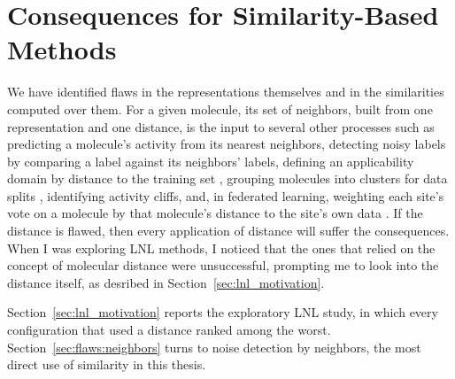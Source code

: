 \section{Consequences for Similarity-Based Methods}\label{sec:flaws:consequences}


We have identified flaws in the representations themselves and in the similarities computed over them. For a given molecule, its set of neighbors, built from one representation and one distance, is the input to several other processes such as predicting a molecule's activity from its nearest neighbors, detecting noisy labels by comparing a label against its neighbors' labels, defining an applicability domain by distance to the training set \citep{Tropsha2010}, grouping molecules into clusters for data splits \citep{Butina1999}, identifying activity cliffs, and, in federated learning, weighting each site's vote on a molecule by that molecule's distance to the site's own data \citep{Hanser2025}. If the distance is flawed, then every application of distance will suffer the consequences. When I was exploring LNL methods, I noticed that the ones that relied on the concept of molecular distance were unsuccessful, prompting me to look into the distance itself, as desribed in  Section~\ref{sec:lnl_motivation}.

Section~\ref{sec:lnl_motivation} reports the exploratory LNL study, in which every configuration that used a distance ranked among the worst. Section~\ref{sec:flaws:neighbors} turns to noise detection by neighbors, the most direct use of similarity in this thesis. 

